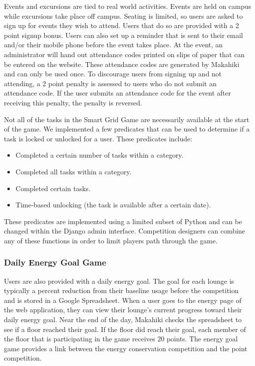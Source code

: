 \documentclass{acm_proc_article-sp}
\begin{document}
Events and excursions are tied to real world activities. Events are held on campus while excursions take place off campus. Seating is limited, so users are asked to sign up for events they wish to attend. Users that do so are provided with a 2 point signup bonus. Users can also set up a reminder that is sent to their email and/or their mobile phone before the event takes place. At the event, an administrator will hand out attendance codes printed on slips of paper that can be entered on the website. These attendance codes are generated by Makahiki and can only be used once. To discourage users from signing up and not attending, a 2 point penalty is assessed to users who do not submit an attendance code. If the user submits an attendance code for the event after receiving this penalty, the penalty is reversed.

Not all of the tasks in the Smart Grid Game are necessarily available at the start of the game. We implemented a few predicates that can be used to determine if a task is locked or unlocked for a user. These predicates include:

\begin{itemize}
  \item Completed a certain number of tasks within a category.
  \item Completed all tasks within a category.
  \item Completed certain tasks.
  \item Time-based unlocking (the task is available after a certain date).
\end{itemize}

These predicates are implemented using a limited subset of Python and can be changed within the Django admin interface. Competition designers can combine any of these functions in order to limit players path through the game.

\subsubsection{Daily Energy Goal Game}
\label{sys:goal-game}

Users are also provided with a daily energy goal. The goal for each lounge is typically a percent reduction from their baseline usage before the competition and is stored in a Google Spreadsheet. When a user goes to the energy page of the web application, they can view their lounge's current progress toward their daily energy goal. Near the end of the day, Makahiki checks the spreadsheet to see if a floor reached their goal. If the floor did reach their goal, each member of the floor that is participating in the game receives 20 points. The energy goal game provides a link between the energy conservation competition and the point competition.
\end{document}
